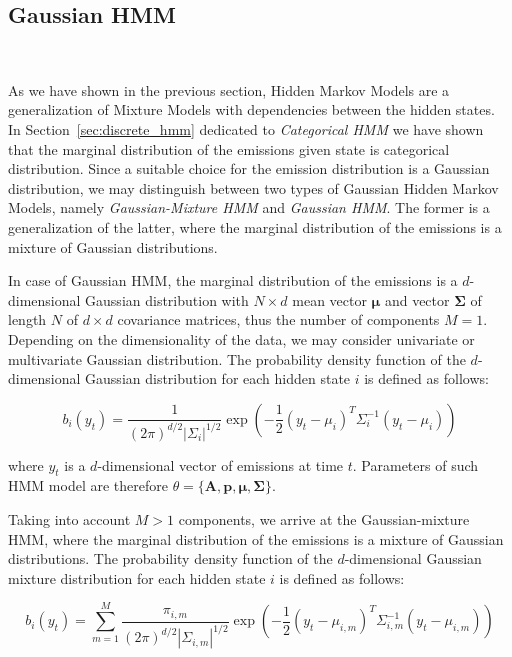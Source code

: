 \subsection{Gaussian HMM}~\label{sec:ghmm}

As we have shown in the previous section, Hidden Markov Models are a generalization of Mixture Models with dependencies between the hidden states.
In Section~\ref{sec:discrete_hmm} dedicated to \textit{Categorical HMM} we have shown that the marginal distribution of the emissions given state is categorical distribution. 
Since a suitable choice for the emission distribution is a Gaussian distribution, we may distinguish between two types of Gaussian Hidden Markov Models,
namely \textit{Gaussian-Mixture HMM} and \textit{Gaussian HMM}. The former is a generalization of the latter, where the marginal distribution of the emissions is a mixture of Gaussian distributions.~\citep{Bishop2006}

In case of Gaussian HMM, the marginal distribution of the emissions is a $d$-dimensional Gaussian distribution with $N \times d$ mean vector $\boldsymbol{\mu}$ and vector $\boldsymbol{\Sigma}$ of length $N$ of $d \times d$ covariance matrices, thus the number of components $M=1$. 
Depending on the dimensionality of the data, we may consider univariate or multivariate Gaussian distribution. The probability density function of the $d$-dimensional Gaussian distribution 
for each hidden state $i$ is defined as follows:

\begin{equation}
    b_i(y_t) = \frac{1}{{(2\pi)}^{d/2}|\Sigma_i|^{1/2}} \exp\left(-\frac{1}{2}{(y_t-\mu_i)}^T\Sigma^{-1}_i(y_t-\mu_i)\right)
\end{equation}

where $y_t$ is a $d$-dimensional vector of emissions at time $t$. Parameters of such HMM model are therefore $\theta = \{\textbf{A},\textbf{p},\boldsymbol{\mu},\boldsymbol{\Sigma}\}$.

Taking into account $M>1$ components, we arrive at the Gaussian-mixture HMM, where the marginal distribution of the emissions is a mixture of Gaussian distributions. 
The probability density function of the $d$-dimensional Gaussian mixture distribution for each hidden state $i$ is defined as follows:

\begin{equation}
    b_i(y_t) = \sum_{m=1}^{M} \frac{\pi_{i,m}}{{(2\pi)}^{d/2}|\Sigma_{i,m}|^{1/2}} \exp\left(-\frac{1}{2}{(y_t-\mu_{i,m})}^T\Sigma^{-1}_{i,m}(y_t-\mu_{i,m})\right)
\end{equation}

